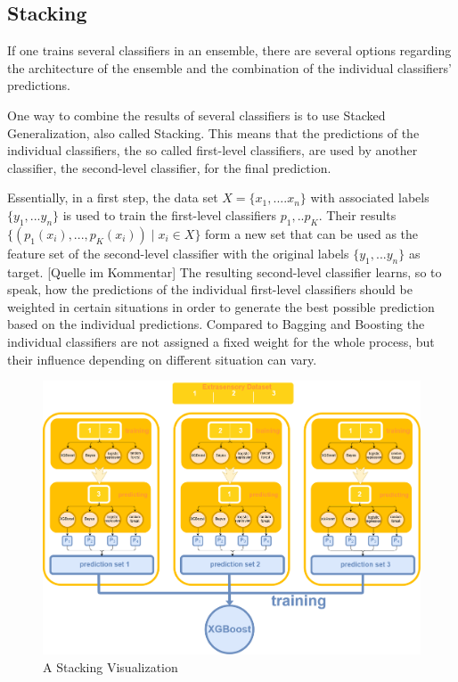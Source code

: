 \subsection{Stacking}\label{subsec:stacking}

If one trains several classifiers in an ensemble, there are several options regarding the architecture of the ensemble and the combination of the individual classifiers' predictions.

One way to combine the results of several classifiers is to use Stacked Generalization, also called Stacking. This means that the predictions of the individual classifiers, the so called first-level classifiers, are used by another classifier, the second-level classifier, for the final prediction. 

Essentially, in a first step, the data set $X = \{x_1, ... .x_n\}$ with associated labels $\{y_1, ... y_n\}$ is used to train the first-level classifiers $p_1, .. p_K$. Their results $\{(p_1(x_i), ... , p_K(x_i)) \mid x_i \in X\}$ form a new set that can be used as the feature set of the second-level classifier with the original labels $\{y_1, ... y_n\}$ as target. [Quelle im Kommentar] %
The resulting second-level classifier learns, so to speak, how the predictions of the individual first-level classifiers should be weighted in certain situations in order to generate the best possible prediction based on the individual predictions. 
Compared to Bagging and Boosting the individual classifiers are not assigned a fixed weight for the whole process, but their influence depending on different situation can vary.
 

\begin{figure}[H]
	\begin{center}
		\includegraphics[width=\textwidth]{images/stacking_diagram.png}
		\caption{A Stacking Visualization}
		\label{abb:stacking}
	\end{center}		
\end{figure}	

